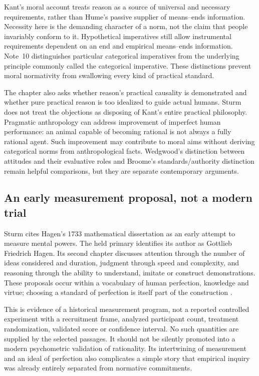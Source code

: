 Kant's moral account treats reason as a source of universal and necessary
requirements, rather than Hume's passive supplier of means--ends
information. Necessity here is the demanding character of a norm, not
the claim that people invariably conform to it. Hypothetical imperatives
still allow instrumental requirements dependent on an end and empirical
means--ends information. Note~10 distinguishes particular categorical
imperatives from the underlying principle commonly called the
categorical imperative. These distinctions prevent moral normativity
from swallowing every kind of practical standard.

The chapter also asks whether reason's practical causality is demonstrated
and whether pure practical reason is too idealized to guide actual humans.
Sturm does not treat the objections as disposing of Kant's entire
practical philosophy. Pragmatic anthropology can address improvement
of imperfect human performance: an animal capable of becoming rational
is not always a fully rational agent. Such improvement may contribute
to moral aims without deriving categorical norms from anthropological
facts. Wedgwood's distinction between attitudes and their evaluative
roles and Broome's standards/authority distinction remain helpful
comparisons, but they are separate contemporary arguments.

\subsection{An early measurement proposal, not a modern trial}

Sturm cites Hagen's 1733 mathematical dissertation as an early attempt
to measure mental powers. The held primary identifies its author as
Gottlieb Friedrich Hagen. Its second chapter discusses attention through
the number of ideas considered and duration, judgment through speed and
complexity, and reasoning through the ability to understand, imitate or
construct demonstrations. These proposals occur within a vocabulary of
human perfection, knowledge and virtue; choosing a standard of perfection
is itself part of the construction
\parencite[Chapter~II, §§4--14]{Hagen1733Measurement}.

This is evidence of a historical measurement program, not a reported
controlled experiment with a recruitment frame, analyzed participant
count, treatment randomization, validated score or confidence interval.
No such quantities are supplied by the selected passages. It should
not be silently promoted into a modern psychometric validation of
rationality. Its intertwining of measurement and an ideal of perfection
also complicates a simple story that empirical inquiry was already
entirely separated from normative commitments.

